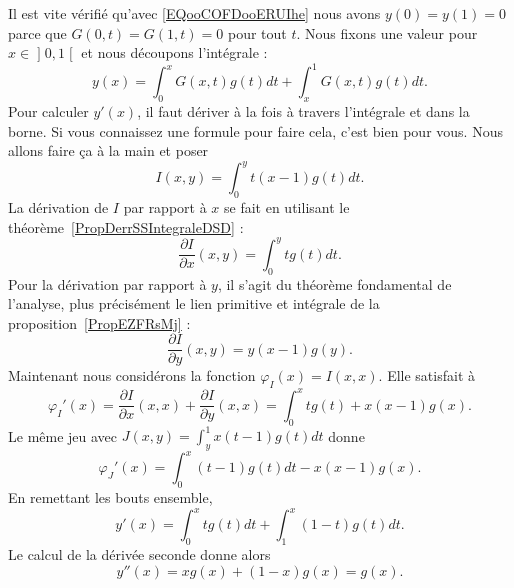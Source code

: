 \begin{subproof}
	Il est vite vérifié qu'avec \eqref{EQooCOFDooERUIhe} nous avons \( y(0)=y(1)=0\) parce que \( G(0,t)=G(1,t)=0\) pour tout \( t\). Nous fixons une valeur pour \( x\in \mathopen] 0 , 1 \mathclose[\) et nous découpons l'intégrale :
	\begin{equation}
		y(x)=\int_0^xG(x,t)g(t)dt+\int_x^1G(x,t)g(t)dt.
	\end{equation}
	Pour calculer \( y'(x)\), il faut dériver à la fois à travers l'intégrale et dans la borne. Si vous connaissez une formule pour faire cela, c'est bien pour vous. Nous allons faire ça à la main et poser
	\begin{equation}
		I(x,y)=\int_0^yt(x-1)g(t)dt.
	\end{equation}
	La dérivation de \( I\) par rapport à \( x\) se fait en utilisant le théorème~\ref{PropDerrSSIntegraleDSD} :
	\begin{equation}
		\frac{ \partial I }{ \partial x }(x,y)=\int_0^ytg(t)dt.
	\end{equation}
	Pour la dérivation par rapport à \( y\), il s'agit du théorème fondamental de l'analyse, plus précisément le lien primitive et intégrale de la proposition~\ref{PropEZFRsMj} :
	\begin{equation}
		\frac{ \partial I }{ \partial y }(x,y)=y(x-1)g(y).
	\end{equation}
	Maintenant nous considérons la fonction \( \varphi_I(x)=I(x,x)\). Elle satisfait à
	\begin{equation}
		\varphi_I'(x)=\frac{ \partial I }{ \partial x }(x,x)+\frac{ \partial I }{ \partial y }(x,x)=\int_0^xtg(t)+x(x-1)g(x).
	\end{equation}
	Le même jeu avec \( J(x,y)=\int_y^1x(t-1)g(t)dt\) donne
	\begin{equation}
		\varphi_J'(x)=\int_0^x(t-1)g(t)dt-x(x-1)g(x).
	\end{equation}
	En remettant les bouts ensemble,
	\begin{equation}
		y'(x)=\int_0^xtg(t)dt+\int_1^x(1-t)g(t)dt.
	\end{equation}
	Le calcul de la dérivée seconde donne alors
	\begin{equation}
		y''(x)=xg(x)+(1-x)g(x)=g(x).
	\end{equation}
\end{subproof}

